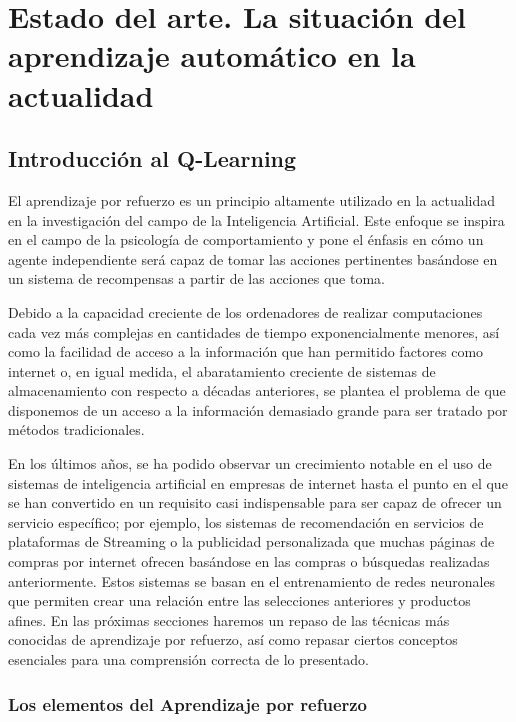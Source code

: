 \documentclass[11pt,spanish,listoffigures,listoftables]{tfgetsinf}
\begin{document}
\chapter{Estado del arte. La situación del aprendizaje automático en la actualidad}

\section{Introducción al Q-Learning}

El aprendizaje por refuerzo es un principio altamente utilizado en la actualidad en la investigación del campo de la Inteligencia Artificial. Este enfoque se inspira en el campo de la psicología de comportamiento y pone el énfasis en cómo un agente independiente será capaz de tomar las acciones pertinentes basándose en un sistema de recompensas a partir de las acciones que toma. \par 

Debido a la capacidad creciente de los ordenadores de realizar computaciones cada vez más complejas en cantidades de tiempo exponencialmente menores, así como la facilidad de acceso a la información que han permitido factores como internet o, en igual medida, el abaratamiento creciente de sistemas de almacenamiento con respecto a décadas anteriores, se plantea el problema de que disponemos de un acceso a la información demasiado grande para ser tratado por métodos tradicionales. 

En los últimos años, se ha podido observar un crecimiento notable en el uso de sistemas de inteligencia artificial en empresas de internet hasta el punto en el que se han convertido en un requisito casi indispensable para ser capaz de ofrecer un servicio específico; por ejemplo, los sistemas de recomendación en servicios de plataformas de Streaming o la publicidad personalizada que muchas páginas de compras por internet ofrecen basándose en las compras o búsquedas realizadas anteriormente. Estos sistemas se basan en el entrenamiento de redes neuronales que permiten crear una relación entre las selecciones anteriores y productos afines. En las próximas secciones haremos un repaso de las técnicas más conocidas de aprendizaje por refuerzo, así como repasar ciertos conceptos esenciales para una comprensión correcta de lo presentado.

\subsection{Los elementos del Aprendizaje por refuerzo}
\end{document}
